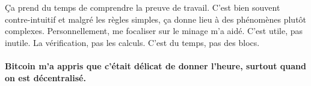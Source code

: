 Ça prend du temps de comprendre la preuve de travail. C'est bien souvent
contre-intuitif et malgré les règles simples, ça donne lieu à des phénomènes
plutôt complexes. Personnellement, me focaliser sur le minage m'a aidé. C'est
utile, pas inutile. La vérification, pas les calculs. C'est du temps, pas des
blocs.

\paragraph{Bitcoin m'a appris que c'était délicat de donner l'heure, surtout
quand on est décentralisé.}

%
%
%
%
%
%
%
